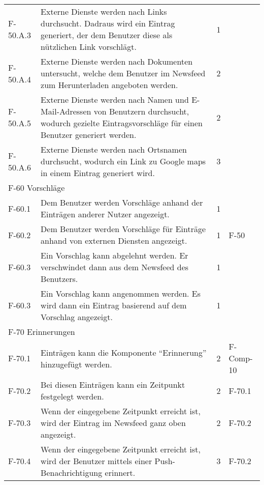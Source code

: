 \begin{tabularx}{\textwidth}{|l|X|l|l|}
    F-50.A.3 & Externe Dienste werden nach Links durchsucht. Dadraus wird ein Eintrag generiert, der dem Benutzer diese als nützlichen Link vorschlägt. & 1 & \\
    F-50.A.4 & Externe Dienste werden nach Dokumenten untersucht, welche dem Benutzer im Newsfeed zum Herunterladen angeboten werden. & 2 & \\
    F-50.A.5 & Externe Dienste werden nach Namen und E-Mail-Adressen von Benutzern durchsucht, wodurch gezielte Eintragsvorschläge für einen Benutzer generiert werden. & 2 & \\
    F-50.A.6 & Externe Dienste werden nach Ortsnamen durchsucht, wodurch ein Link zu Google maps in einem Eintrag generiert wird. & 3 & \\
    \hline
    \multicolumn{4}{|l|}{F-60 Vorschläge}\\
    \hline 
    F-60.1 & Dem Benutzer werden Vorschläge anhand der Einträgen anderer Nutzer angezeigt. & 1 & \\
    F-60.2 & Dem Benutzer werden Vorschläge für Einträge anhand von externen Diensten angezeigt. & 1 & F-50 \\
    F-60.3 & Ein Vorschlag kann abgelehnt werden. Er verschwindet dann aus dem Newsfeed des Benutzers. & 1 & \\
    F-60.3 & Ein Vorschlag kann angenommen werden. Es wird dann ein Eintrag basierend auf dem Vorschlag angezeigt. & 1 & \\
    \hline
    \multicolumn{4}{|l|}{F-70 Erinnerungen}\\
    F-70.1 & Einträgen kann die Komponente \enquote{Erinnerung} hinzugefügt werden. & 2 & F-Comp-10 \\
    F-70.2 & Bei diesen Einträgen kann ein Zeitpunkt festgelegt werden. & 2 & F-70.1 \\
    F-70.3 & Wenn der eingegebene Zeitpunkt erreicht ist, wird der Eintrag im Newsfeed ganz oben angezeigt. & 2 & F-70.2 \\
    F-70.4 & Wenn der eingegebene Zeitpunkt erreicht ist, wird der Benutzer mittels einer Push-Benachrichtigung erinnert. & 3 & F-70.2 \\
    \hline


\end{tabularx}
